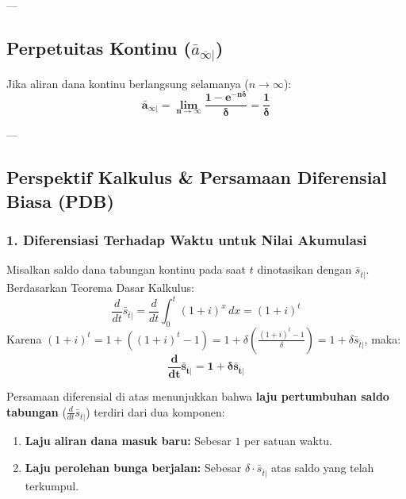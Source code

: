 \documentclass[11pt,a4paper]{article}
\begin{document}
---

\subsection{Perpetuitas Kontinu (\texorpdfstring{$\bar{a}_{\overline{\infty}|}$}{a\_bar\_infinity})}

Jika aliran dana kontinu berlangsung selamanya ($n \to \infty$):
\begin{equation}
    \mathbf{\bar{a}_{\overline{\infty}|} = \lim_{n \to \infty} \frac{1 - e^{-n\delta}}{\delta} = \frac{1}{\delta}}
\end{equation}

---

\subsection{Perspektif Kalkulus \& Persamaan Diferensial Biasa (PDB)}

\subsubsection{1. Diferensiasi Terhadap Waktu untuk Nilai Akumulasi}
Misalkan saldo dana tabungan kontinu pada saat $t$ dinotasikan dengan $\bar{s}_{\overline{t}|}$. Berdasarkan Teorema Dasar Kalkulus:
\begin{equation}
    \frac{d}{dt} \bar{s}_{\overline{t}|} = \frac{d}{dt} \int_{0}^{t} (1+i)^x \, dx = (1+i)^t
\end{equation}
Karena $(1+i)^t = 1 + \left((1+i)^t - 1\right) = 1 + \delta \left( \frac{(1+i)^t - 1}{\delta} \right) = 1 + \delta \bar{s}_{\overline{t}|}$, maka:
\begin{equation}
    \mathbf{\frac{d}{dt} \bar{s}_{\overline{t}|} = 1 + \delta \bar{s}_{\overline{t}|}}
\end{equation}

\begin{notebox}
Persamaan diferensial di atas menunjukkan bahwa \textbf{laju pertumbuhan saldo tabungan} ($\frac{d}{dt}\bar{s}_{\overline{t}|}$) terdiri dari dua komponen:
\begin{enumerate}
    \item \textbf{Laju aliran dana masuk baru:} Sebesar $1$ per satuan waktu.
    \item \textbf{Laju perolehan bunga berjalan:} Sebesar $\delta \cdot \bar{s}_{\overline{t}|}$ atas saldo yang telah terkumpul.
\end{enumerate}
\end{notebox}
\end{document}
